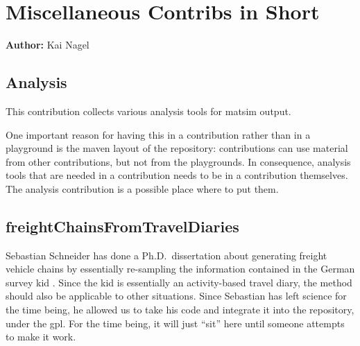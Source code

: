 \chapter{Miscellaneous Contribs in Short}
\label{ch:misccontribs}

\hfill \textbf{Author:} Kai Nagel

\section{Analysis}
\label{sec:contrib-analysis}



This \gls{contribution} collects various analysis tools for \gls{matsim} output.  

One important reason for having this in a \gls{contribution} rather than in a playground is the \gls{maven} layout of the repository: \Glspl{contribution} can use material from other \glspl{contribution}, but not from the playgrounds. 
In consequence, analysis tools that are needed in a \gls{contribution} needs to be in a \gls{contribution} themselves. 
The analysis \gls{contribution} is a possible place where to put them.

\section{freightChainsFromTravelDiaries}
\label{sec:freightChainsFromTravelDiaries}
Sebastian Schneider has done a Ph.D.\ dissertation about generating freight vehicle chains by essentially re-sampling the information contained in the German survey \gls{kid} \citep{SteinmeyerWagner2005KiD}.  
Since the \gls{kid} is essentially an activity-based travel diary, the method should also be applicable to other situations.
Since Sebastian has left science for the time being, he allowed us to take his code and integrate it into the repository, under the \gls{gpl}. For the time being, it will just ``sit'' here until someone attempts to make it work.


